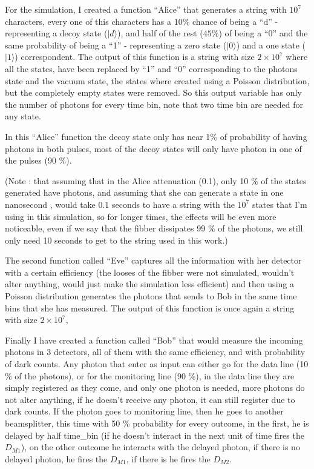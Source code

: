 \begin{refsection}
For the simulation, I created a function ``Alice'' that generates a string with $10^7$ characters, every one of this characters has a $10 \%$ chance of being a ``d'' - representing a decoy state ($|d\rangle$), and half of the rest ($45 \%$) of being a ``0'' and the same probability of being a ``1'' - representing a zero state ($|0\rangle$) and a one state ($|1\rangle$) correspondent. The output of this function is a string with size $2\times10^7$ where all the states, have been replaced by ``1'' and ``0'' corresponding to the photons state and the vacuum state, the states where created using a Poisson distribution, but the completely empty states were removed. So this output variable has only the number of photons for every time bin, note that two time bin are needed for any state.

In this ``Alice'' function the decoy state only has near 1\% of probability of having photons in both pulses, most of the decoy states will only have photon in one of the pulses (90 \%).

(Note : that assuming that in the Alice attenuation (0.1), only 10 \% of the states generated have photons, and assuming that she can generate a state in one nanosecond \cite{roberts2017modulator}, would take $0.1$ seconds to have a string with the $10^7$ states that I'm using in this simulation, so for longer times, the effects will be even more noticeable, even if we say that the fibber dissipates 99 \% of the photons, we still only need 10 seconds to get to the string used in this work.)

The second function called ``Eve'' captures all the information with her detector with a certain efficiency (the looses of the fibber were not simulated, wouldn't alter anything, would just make the simulation less efficient)  and then using a Poisson distribution generates the photons that sends to Bob in the same time bins that she has measured. The output of this function is once again a string with size $2\times10^7$, 

Finally I have created a function called ``Bob'' that would measure the incoming photons in 3 detectors, all of them with the same efficiency, and with probability of dark counts. Any photon that enter as input can either go for the data line (10 \% of the photons), or for the monitoring line (90 \%), in the data line they are simply registered as they come, and only one photon is needed, more photons do not alter anything, if he doesn't receive any photon, it can still register due to dark counts. If the photon goes to monitoring line, then he goes to another beamsplitter, this time with 50 \% probability for every outcome, in the first, he is delayed by half time_bin (if he doesn't interact in the next unit of time fires the $D_{M1}$), on the other outcome he interacts with the delayed photon, if there is no delayed photon, he fires the $D_{M1}$, if there is he fires the $D_{M2}$.


\end{refsection}
